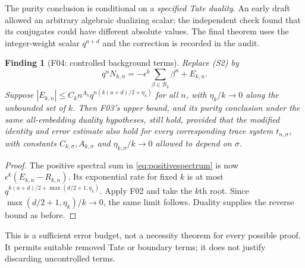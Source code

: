 \documentclass[11pt,a4paper]{article}
\newcommand{\fid}[1]{\textsf{#1}}\newcommand{\gate}[1]{\textsf{#1}}
\theoremstyle{named}\newtheorem{finding}{Finding}[section]
\theoremstyle{definition}\newtheorem{definition}[finding]{Definition}
\theoremstyle{remark}\newtheorem{remark}[finding]{Remark}
\begin{document}
The purity conclusion is conditional on a \emph{specified Tate duality}. An early draft allowed an arbitrary algebraic dualizing scalar; the independent check found that its conjugates could have different absolute values. The final theorem uses the integer-weight scalar $q^{a+d}$ and the correction is recorded in the audit.

\begin{finding}[\fid{F04}: controlled background terms]\label{f:errors}
Replace (S2) by
\[
 q^nN_{k,n}=-\epsilon^k\sum_{\beta\in\mathcal B_k}\beta^n+E_{k,n}.
\]
Suppose $|E_{k,n}|\le C_kn^{A_k}q^{n(k(a+d)/2+\eta_k)}$ for all $n$, with $\eta_k/k\to0$ along the unbounded set of $k$. Then \fid{F03}'s upper bound, and its purity conclusion under the same all-embedding duality hypotheses, still hold, provided that the modified identity and error estimate also hold for every corresponding trace system $t_{n,\sigma}$, with constants $C_{k,\sigma},A_{k,\sigma}$ and $\eta_{k,\sigma}/k\to0$ allowed to depend on $\sigma$.
\end{finding}
\begin{proof}
The positive spectral sum in \eqref{eq:positivespectrum} is now $\epsilon^k(E_{k,n}-R_{k,n})$. Its exponential rate for fixed $k$ is at most
$q^{k(a+d)/2+\max(d/2+1,\eta_k)}$. Apply \fid{F02} and take the $k$th root. Since $\max(d/2+1,\eta_k)/k\to0$, the same limit follows. Duality supplies the reverse bound as before.
\end{proof}
This is a sufficient error budget, not a necessity theorem for every possible proof. It permits suitable removed Tate or boundary terms; it does not justify discarding uncontrolled terms.
\end{document}

